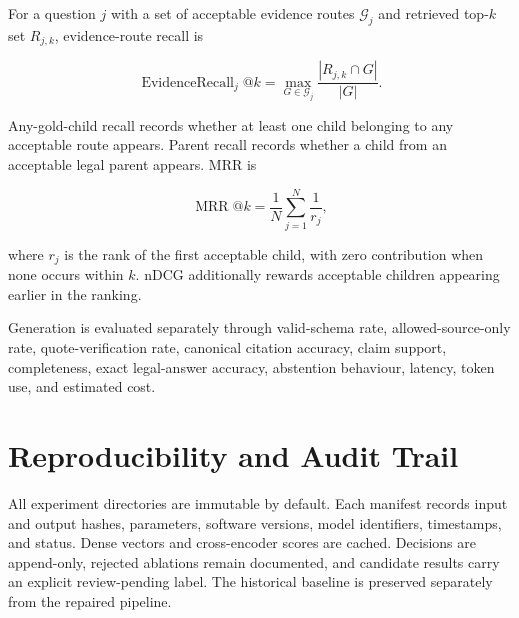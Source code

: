 For a question $j$ with a set of acceptable evidence routes $\mathcal{G}_j$ and retrieved top-$k$ set $R_{j,k}$, evidence-route recall is

\begin{equation}
\operatorname{EvidenceRecall}_{j}@k =
\max_{G \in \mathcal{G}_j}
\frac{|R_{j,k} \cap G|}{|G|}.
\label{eq:evidence-recall}
\end{equation}

Any-gold-child recall records whether at least one child belonging to any acceptable route appears. Parent recall records whether a child from an acceptable legal parent appears. \ac{MRR} is

\begin{equation}
\operatorname{MRR}@k =
\frac{1}{N}\sum_{j=1}^{N}\frac{1}{r_j},
\label{eq:mrr}
\end{equation}

where $r_j$ is the rank of the first acceptable child, with zero contribution when none occurs within $k$. \ac{nDCG} additionally rewards acceptable children appearing earlier in the ranking.

Generation is evaluated separately through valid-schema rate, allowed-source-only rate, quote-verification rate, canonical citation accuracy, claim support, completeness, exact legal-answer accuracy, abstention behaviour, latency, token use, and estimated cost.

\section{Reproducibility and Audit Trail}

All experiment directories are immutable by default. Each manifest records input and output hashes, parameters, software versions, model identifiers, timestamps, and status. Dense vectors and cross-encoder scores are cached. Decisions are append-only, rejected ablations remain documented, and candidate results carry an explicit review-pending label. The historical baseline is preserved separately from the repaired pipeline.

